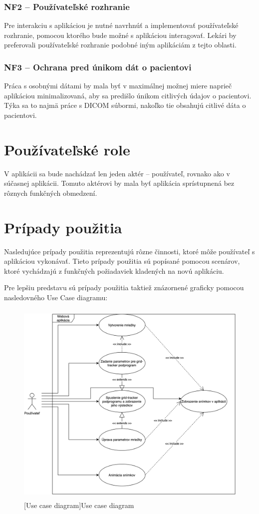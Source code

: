 \subsubsection {NF2 -- Používateľské rozhranie}
Pre interakciu s aplikáciou je nutné navrhnúť a implementovať používateľské rozhranie, pomocou ktorého bude možné s aplikáciou interagovať. Lekári by preferovali používateľské rozhranie podobné iným aplikáciám z tejto oblasti.

\subsubsection {NF3 -- Ochrana pred únikom dát o pacientovi}
Práca s osobnými dátami by mala byť v maximálnej možnej miere naprieč aplikáciou minimalizovaná, aby sa predišlo únikom citlivých údajov o pacientovi. Týka sa to najmä práce s DICOM súbormi, nakoľko tie obsahujú citlivé dáta o pacientovi.

\clearpage

\section {Používateľské role}
V aplikácii sa bude nachádzať len jeden aktér -- používateľ, rovnako ako v súčasnej aplikácii. Tomuto aktérovi by mala byť aplikácia sprístupnená bez rôznych funkčných obmedzení.

\section {Prípady použitia}
Nasledujúce prípady použitia reprezentujú rôzne činnosti, ktoré môže používateľ s aplikáciou vykonávať. Tieto prípady použitia sú popísané pomocou scenárov, ktoré vychádzajú z funkčných požiadaviek kladených na novú aplikáciu.

Pre lepšiu predstavu sú prípady použitia taktiež znázornené graficky pomocou nasledovného Use Case diagramu:

\begin {figure}[H]
        \centering
        \includegraphics[height=10cm]{media/graphs/usecase.png}
        \captionsetup{justification=centering}
        [Use case diagram]{Use case diagram}
\end {figure}

